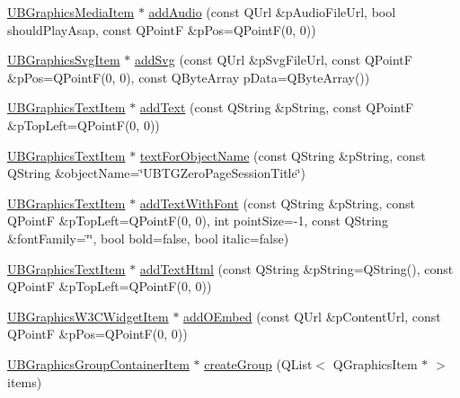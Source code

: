 \begin{DoxyCompactItemize}
\item 
\hyperlink{class_u_b_graphics_media_item}{U\-B\-Graphics\-Media\-Item} $\ast$ \hyperlink{class_u_b_graphics_scene_a3cb053323480903a3b3b49c14cbb44e8}{add\-Audio} (const Q\-Url \&p\-Audio\-File\-Url, bool should\-Play\-Asap, const Q\-Point\-F \&p\-Pos=Q\-Point\-F(0, 0))
\item 
\hyperlink{class_u_b_graphics_svg_item}{U\-B\-Graphics\-Svg\-Item} $\ast$ \hyperlink{class_u_b_graphics_scene_a274053bbdde02c1d4626254d2123171a}{add\-Svg} (const Q\-Url \&p\-Svg\-File\-Url, const Q\-Point\-F \&p\-Pos=Q\-Point\-F(0, 0), const Q\-Byte\-Array p\-Data=Q\-Byte\-Array())
\item 
\hyperlink{class_u_b_graphics_text_item}{U\-B\-Graphics\-Text\-Item} $\ast$ \hyperlink{class_u_b_graphics_scene_adbfabe62d183758c50d8259d2e569152}{add\-Text} (const Q\-String \&p\-String, const Q\-Point\-F \&p\-Top\-Left=Q\-Point\-F(0, 0))
\item 
\hyperlink{class_u_b_graphics_text_item}{U\-B\-Graphics\-Text\-Item} $\ast$ \hyperlink{class_u_b_graphics_scene_a2ae7b40259282b306f5dc21e1e12e607}{text\-For\-Object\-Name} (const Q\-String \&p\-String, const Q\-String \&object\-Name=\char`\"{}U\-B\-T\-G\-Zero\-Page\-Session\-Title\char`\"{})
\item 
\hyperlink{class_u_b_graphics_text_item}{U\-B\-Graphics\-Text\-Item} $\ast$ \hyperlink{class_u_b_graphics_scene_aebfa0ab541a75af5b21b384e4a05c00e}{add\-Text\-With\-Font} (const Q\-String \&p\-String, const Q\-Point\-F \&p\-Top\-Left=Q\-Point\-F(0, 0), int point\-Size=-\/1, const Q\-String \&font\-Family=\char`\"{}\char`\"{}, bool bold=false, bool italic=false)
\item 
\hyperlink{class_u_b_graphics_text_item}{U\-B\-Graphics\-Text\-Item} $\ast$ \hyperlink{class_u_b_graphics_scene_a0161e4cd7210721409b7da0e20fc6260}{add\-Text\-Html} (const Q\-String \&p\-String=Q\-String(), const Q\-Point\-F \&p\-Top\-Left=Q\-Point\-F(0, 0))
\item 
\hyperlink{class_u_b_graphics_w3_c_widget_item}{U\-B\-Graphics\-W3\-C\-Widget\-Item} $\ast$ \hyperlink{class_u_b_graphics_scene_a2729368a3a28a4d9669f23f171752194}{add\-O\-Embed} (const Q\-Url \&p\-Content\-Url, const Q\-Point\-F \&p\-Pos=Q\-Point\-F(0, 0))
\item 
\hyperlink{class_u_b_graphics_group_container_item}{U\-B\-Graphics\-Group\-Container\-Item} $\ast$ \hyperlink{class_u_b_graphics_scene_a9ec671a9afcc75a52267102c0a22b98b}{create\-Group} (Q\-List$<$ Q\-Graphics\-Item $\ast$ $>$ items)
\item 

\end{DoxyCompactItemize}
